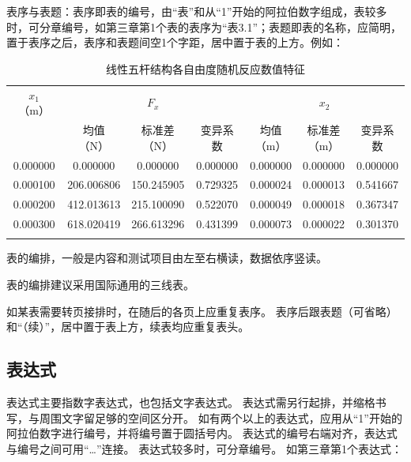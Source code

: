 表序与表题：表序即表的编号，由“表”和从“1”开始的阿拉伯数字组成，表较多时，可分章编号，如第三章第1个表的表序为“表3.1”；表题即表的名称，应简明，置于表序之后，表序和表题间空1个字距，居中置于表的上方。例如：

\begin{table}[H]
    \centering
    \caption{线性五杆结构各自由度随机反应数值特征}
    \label{tab:example}
    \begin{tabular}{c|c|c|c|c|c|c}
        \Xhline{1.5pt}
        \multirowcell{2}[-7pt][c]{$x_{1}$                                                \\（m）} & \multicolumn{3}{c|}{$F_{x}$} & \multicolumn{3}{c}{$x_{2}$}                                             \\
        \cline{2-7}
                 & \makecell{均值                                                          \\（N）}                        & \makecell{标准差\\（N）}                      & 变异系数     & \makecell{均值\\（m）}    & \makecell{标准差\\（m）}   & 变异系数     \\
        \hline
        0.000000 & 0.000000     & 0.000000   & 0.000000 & 0.000000 & 0.000000 & 0.000000 \\
        0.000100 & 206.006806   & 150.245905 & 0.729325 & 0.000024 & 0.000013 & 0.541667 \\
        0.000200 & 412.013613   & 215.100090 & 0.522070 & 0.000049 & 0.000018 & 0.367347 \\
        0.000300 & 618.020419   & 266.613296 & 0.431399 & 0.000073 & 0.000022 & 0.301370 \\
        \Xhline{1.5pt}
    \end{tabular}
\end{table}

表的编排，一般是内容和测试项目由左至右横读，数据依序竖读。

表的编排建议采用国际通用的三线表。

如某表需要转页接排时，在随后的各页上应重复表序。
表序后跟表题（可省略）和“（续）”，居中置于表上方，续表均应重复表头。

\subsection{表达式}

表达式主要指数字表达式，也包括文字表达式。
表达式需另行起排，并缩格书写，与周围文字留足够的空间区分开。
如有两个以上的表达式，应用从“1”开始的阿拉伯数字进行编号，并将编号置于圆括号内。
表达式的编号右端对齐，表达式与编号之间可用“…”连接。
表达式较多时，可分章编号。
如第三章第1个表达式：

